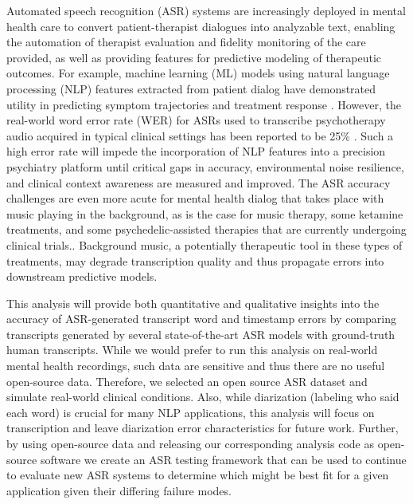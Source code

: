 \documentclass{article}
\begin{document}
Automated speech recognition (ASR) systems are increasingly deployed in mental health care to convert patient-therapist dialogues into analyzable text, enabling the automation of therapist evaluation and fidelity monitoring of the care provided, as well as providing features for predictive modeling of therapeutic outcomes. For example, machine learning (ML) models using natural language processing (NLP) features extracted from patient dialog have demonstrated utility in predicting symptom trajectories and treatment response \cite{dougherty2023psilocybin,cohen2024evaluating,siegel2024enrichment}. However, the real-world word error rate (WER) for ASRs used to transcribe psychotherapy audio acquired in typical clinical settings has been reported to be 25\% \cite{miner2020asrpsychotherapy}. Such a high error rate will impede the incorporation of NLP features into a precision psychiatry platform until critical gaps in accuracy, environmental noise resilience, and clinical context awareness are measured and improved. The ASR accuracy challenges are even more acute for mental health dialog that takes place with music playing in the background, as is the case for music therapy, some ketamine treatments, and some psychedelic-assisted therapies that are currently undergoing clinical trials.\cite{kaelen2018hidden,carhart2018psychedelics,jerotic2024psychedelia}. Background music, a potentially therapeutic tool in these types of treatments, may degrade transcription quality \cite{malek2017musicasr,malek2018musicasr} and thus propagate errors into downstream predictive models.

This analysis will provide both quantitative and qualitative insights into the accuracy of ASR-generated transcript word and timestamp errors by comparing transcripts generated by several state-of-the-art ASR models with ground-truth human transcripts. While we would prefer to run this analysis on real-world mental health recordings, such data are sensitive and thus there are no useful open-source data. Therefore, we selected an open source ASR dataset and simulate real-world clinical conditions. Also, while diarization (labeling who said each word) is crucial for many NLP applications, this analysis will focus on transcription and leave diarization error characteristics for future work. Further, by using open-source data and releasing our corresponding analysis code as open-source software we create an ASR testing framework that can be used to continue to evaluate new ASR systems to determine which might be best fit for a given application given their differing failure modes.
\end{document}
